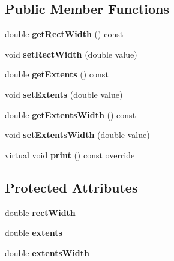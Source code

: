 \subsection*{Public Member Functions}
\begin{DoxyCompactItemize}
\item 
double {\bfseries get\+Rect\+Width} () const \hypertarget{class_c_a_d_m_text_aa96b0a212ae5a028a474724853ec2e99}{}\label{class_c_a_d_m_text_aa96b0a212ae5a028a474724853ec2e99}

\item 
void {\bfseries set\+Rect\+Width} (double value)\hypertarget{class_c_a_d_m_text_ad1d46ca2fcf36dad4cbed184a73276a1}{}\label{class_c_a_d_m_text_ad1d46ca2fcf36dad4cbed184a73276a1}

\item 
double {\bfseries get\+Extents} () const \hypertarget{class_c_a_d_m_text_af98eea6a6750c56e594ab65a40ed0bd4}{}\label{class_c_a_d_m_text_af98eea6a6750c56e594ab65a40ed0bd4}

\item 
void {\bfseries set\+Extents} (double value)\hypertarget{class_c_a_d_m_text_a070aa2106db1d9c7b1c38e0109ef9c62}{}\label{class_c_a_d_m_text_a070aa2106db1d9c7b1c38e0109ef9c62}

\item 
double {\bfseries get\+Extents\+Width} () const \hypertarget{class_c_a_d_m_text_a2169394e64b4fa46ec8b1d5c166beeec}{}\label{class_c_a_d_m_text_a2169394e64b4fa46ec8b1d5c166beeec}

\item 
void {\bfseries set\+Extents\+Width} (double value)\hypertarget{class_c_a_d_m_text_ae439b628a578c5828c250232bcd77fb0}{}\label{class_c_a_d_m_text_ae439b628a578c5828c250232bcd77fb0}

\item 
virtual void {\bfseries print} () const  override\hypertarget{class_c_a_d_m_text_a3de2f102eb782b848f54adc748d55c33}{}\label{class_c_a_d_m_text_a3de2f102eb782b848f54adc748d55c33}

\end{DoxyCompactItemize}
\subsection*{Protected Attributes}
\begin{DoxyCompactItemize}
\item 
double {\bfseries rect\+Width}\hypertarget{class_c_a_d_m_text_abca1c6ffbb45db76b7d51af03fffd52a}{}\label{class_c_a_d_m_text_abca1c6ffbb45db76b7d51af03fffd52a}

\item 
double {\bfseries extents}\hypertarget{class_c_a_d_m_text_af4eb8fd85596249788cf29fc749e3ad1}{}\label{class_c_a_d_m_text_af4eb8fd85596249788cf29fc749e3ad1}

\item 
double {\bfseries extents\+Width}\hypertarget{class_c_a_d_m_text_a1ae61c088810cf81833a65758242dcfd}{}\label{class_c_a_d_m_text_a1ae61c088810cf81833a65758242dcfd}

\end{DoxyCompactItemize}
